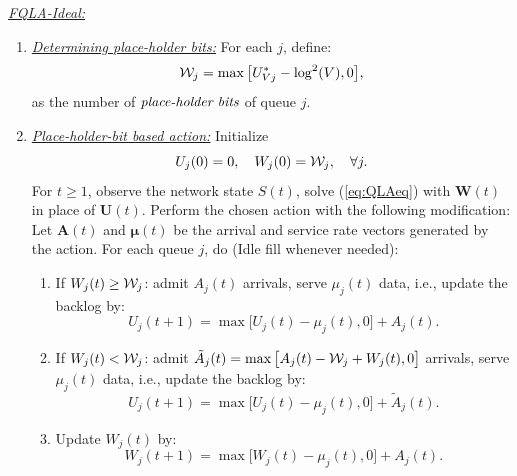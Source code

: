 \documentclass[journal]{IEEEtran}
\newcommand{\bv}[1]{{\boldsymbol{#1} }}
\newcommand{\script}[1]{{{\cal{#1} }}}
\begin{document}
\emph{\underline{FQLA-Ideal:}} 
\begin{enumerate}
\item[(I)] \emph{\underline{Determining place-holder bits:}} 
For each $j$, define:  
\begin{eqnarray}
\script{W}_j=\max\big[U^*_{Vj}-\log^2(V),0\big], \label{eq:WLdef}
\end{eqnarray}
as the number of $\emph{place-holder bits}$ of queue $j$. 
\item[(II)] \emph{\underline{Place-holder-bit based action:}} Initialize
\[U_{j}(0)=0,\quad W_j(0)=\script{W}_j,  \quad\forall j.\]
For  $t\geq 1$, observe the network state $S(t)$, solve (\ref{eq:QLAeq}) with $\bv{W}(t)$ in place of $\bv{U}(t)$. Perform the chosen action with the following modification: Let $\bv{A}(t)$ and $\bv{\mu}(t)$ be the arrival and service rate vectors generated by the action. For each queue $j$, do (Idle fill whenever needed):
\begin{enumerate}
\item If $W_j(t)\geq \script{W}_j$: admit $A_j(t)$ arrivals, serve $\mu_j(t)$ data, i.e., update the backlog by: \[U_j(t+1)=\max\big[U_j(t)-\mu_j(t), 0\big]+A_j(t). \]

\item If $W_j(t)<\script{W}_j$: admit $\tilde{A}_j(t)=\max\big[A_j(t)-\script{W}_j+W_j(t), 0\big]$ arrivals, serve $\mu_j(t)$ data, i.e., update the backlog by:
\[U_j(t+1)=\max\big[U_j(t)-\mu_j(t),0\big]+\tilde{A}_j(t).\] 

\item Update $W_j(t)$ by:
\[W_j(t+1)=\max\big[W_j(t)-\mu_j(t), 0\big]+A_j(t). \]
\end{enumerate}
\end{enumerate}
\end{document}

